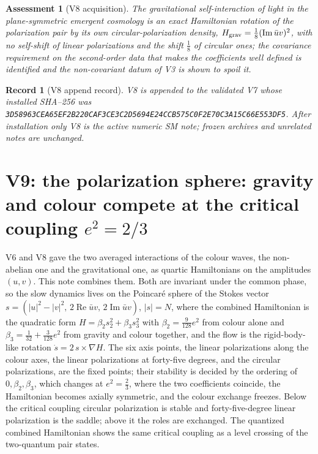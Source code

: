 \documentclass[11pt]{article}
\newtheorem{assessment}[theorem]{Assessment}
\newtheorem{record}[theorem]{Record}
\theoremstyle{remark}
\begin{document}
\begin{assessment}[V8 acquisition]
\label{ass:v20v8}
The gravitational self-interaction of light in the plane-symmetric
emergent cosmology is an exact Hamiltonian rotation of the
polarization pair by its own circular-polarization density,
\(H_{\rm grav}=\tfrac18(\operatorname{Im}\bar uv)^2\), with no
self-shift of linear polarizations and the shift \(\tfrac18\) of
circular ones; the covariance requirement on the second-order data
that makes the coefficients well defined is identified and the
non-covariant datum of V3 is shown to spoil it.
\end{assessment}

\begin{record}[V8 append record]
\label{rec:v20v8}
V8 is appended to the validated V7 whose installed SHA--256 was
\texttt{3D58963CEA65EF2B220CAF3CE3C2D5694E24CCB575C0F2E70C3A15C66E553DF5}.
After installation only V8 is the active numeric SM note; frozen
archives and unrelated notes are unchanged.
\end{record}


\section{V9: the polarization sphere: gravity and colour compete at the critical coupling \texorpdfstring{$e^2=2/3$}{e2 = 2/3}}
\label{sec:v20v9}

V6 and V8 gave the two averaged interactions of the colour waves,
the non-abelian one and the gravitational one, as quartic
Hamiltonians on the amplitudes \((u,v)\).  This note combines them.
Both are invariant under the common phase, so the slow dynamics lives
on the Poincar\'e sphere of the Stokes vector
\(s=(|u|^2-|v|^2,\,2\operatorname{Re}\bar uv,\,2\operatorname{Im}\bar uv)\),
\(|s|=N\), where the combined Hamiltonian is the quadratic form
\(H=\beta_2s_2^2+\beta_3s_3^2\) with \(\beta_2=\tfrac9{128}e^2\) from
colour alone and \(\beta_3=\tfrac1{32}+\tfrac3{128}e^2\) from gravity
and colour together, and the flow is the rigid-body-like rotation
\(\dot s=2\,s\times\nabla H\).  The six axis points, the linear
polarizations along the colour axes, the linear polarizations at
forty-five degrees, and the circular polarizations, are the fixed
points; their stability is decided by the ordering of \(0,\beta_2,\beta_3\),
which changes at \(e^2=\tfrac23\), where the two coefficients coincide,
the Hamiltonian becomes axially symmetric, and the colour exchange
freezes.  Below the critical coupling circular polarization is
stable and forty-five-degree linear polarization is the saddle; above
it the roles are exchanged.  The quantized combined Hamiltonian shows
the same critical coupling as a level crossing of the two-quantum
pair states.
\end{document}
